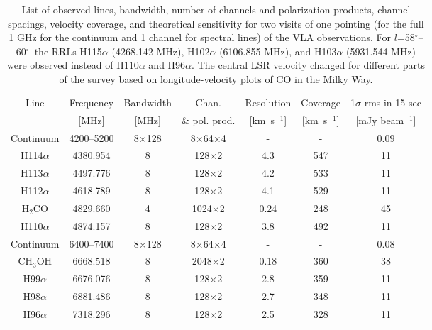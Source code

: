\documentclass{aa}
\newcommand{\kms}{km~s$^{-1}$}
\newcommand{\degree}{$^\circ$}
\DeclareRobustCommand{\kms}{km\,${\rm s}^{-1}$}
\begin{document}
\begin{table*}
\centering
\small
\begin{tabular}{ccccccc}
Line & Frequency &  Bandwidth & Chan.& Resolution & Coverage & 1$\sigma$ 
rms in 15 sec\\
     & [MHz]     &    [MHz]   &  \& pol. prod. & [\kms]&[\kms] & [mJy beam$^{-1}$]\\
\hline
\hline
Continuum&4200--5200 & 8$\times$128  &8$\times$64$\times$4&-&-&0.09 \\
H114$\alpha$ & 4380.954 & 8 &  128$\times$2 & 4.3 & 547 & 11\\
H113$\alpha$ & 4497.776 & 8 &  128$\times$2 & 4.2 & 533 & 11\\
H112$\alpha$ & 4618.789 & 8 &  128$\times$2 & 4.1 & 529 & 11\\
H$_2$CO      & 4829.660 & 4 & 1024$\times$2& 0.24 & 248 & 45\\
H110$\alpha$ & 4874.157 & 8 &  128$\times$2 & 3.8 & 492 & 11 \\
\hline
Continuum&6400--7400 & 8$\times$128  &8$\times$64$\times$4&-&-&0.08\\
CH$_3$OH    & 6668.518 & 8 & 2048$\times$2& 0.18 &  360 & 38\\
H99$\alpha$  & 6676.076 & 8 &  128$\times$2& 2.8 & 359 & 11\\
H98$\alpha$  & 6881.486 & 8 &  128$\times$2& 2.7 & 348 & 11\\
H96$\alpha$  & 7318.296 & 8 &  128$\times$2 & 2.5 & 328 & 11\\
\hline
\hline
\end{tabular}
\caption{List of observed lines, bandwidth, number of channels and polarization products, channel spacings, velocity coverage, and theoretical sensitivity for two visits of one pointing (for the full 1 GHz for the continuum and 1 channel for spectral lines) of the VLA observations. For $l$=58\degree--60\degree\ the RRLs H115$\alpha$ (4268.142 MHz), H102$\alpha$ (6106.855 MHz), and H103$\alpha$ (5931.544 MHz) were observed instead of H110$\alpha$ and H96$\alpha$. The central LSR velocity changed for different parts of the survey based on longitude-velocity plots of CO in the Milky Way.}
\label{correl}
\end{table*}
\end{document}
